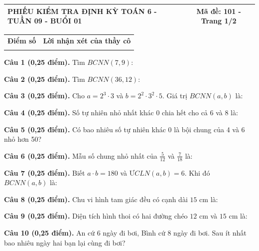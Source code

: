 \documentclass[12pt,a4paper]{article}
\begin{document}
\pagestyle{empty}
\noindent
\begin{tabularx}{\linewidth}{|X|c|}
\hline
\textbf{PHIẾU KIỂM TRA ĐỊNH KỲ TOÁN 6 - TUẦN 09 - BUỔI 01} & \textbf{Mã đề: 101 - Trang 1/2} \\
\hline
\end{tabularx}

\vspace{1.0mm}

\noindent
\begin{tabularx}{\linewidth}{|p{3.2cm}|X|}
\hline
\centering\textbf{Điểm số} & \centering\textbf{Lời nhận xét của thầy cô} \tabularnewline
\rule{0pt}{1.8cm} & \\
\hline
\end{tabularx}

\vspace{1.0mm}

\noindent\textbf{Câu 1 (0,25 điểm).} Tìm $BCNN(7, 9)$: \par\vspace{0.25mm}
\noindent\textbf{Câu 2 (0,25 điểm).} Tìm $BCNN(36, 12)$: \par\vspace{0.25mm}
\noindent\textbf{Câu 3 (0,25 điểm).} Cho $a = 2^3 \cdot 3$ và $b = 2^2 \cdot 3^2 \cdot 5$. Giá trị $BCNN(a, b)$ là: \par\vspace{0.25mm}
\noindent\textbf{Câu 4 (0,25 điểm).} Số tự nhiên nhỏ nhất khác 0 chia hết cho cả 6 và 8 là: \par\vspace{0.25mm}
\noindent\textbf{Câu 5 (0,25 điểm).} Có bao nhiêu số tự nhiên khác 0 là bội chung của 4 và 6 nhỏ hơn 50? \par\vspace{0.25mm}
\noindent\textbf{Câu 6 (0,25 điểm).} Mẫu số chung nhỏ nhất của $\frac{5}{12}$ và $\frac{7}{18}$ là: \par\vspace{0.25mm}
\noindent\textbf{Câu 7 (0,25 điểm).} Biết $a \cdot b = 180$ và $ƯCLN(a, b) = 6$. Khi đó $BCNN(a, b)$ là: \par\vspace{0.25mm}
\noindent\textbf{Câu 8 (0,25 điểm).} Chu vi hình tam giác đều có cạnh dài $15\text{ cm}$ là: \par\vspace{0.25mm}
\noindent\textbf{Câu 9 (0,25 điểm).} Diện tích hình thoi có hai đường chéo $12\text{ cm}$ và $15\text{ cm}$ là: \par\vspace{0.25mm}
\noindent\textbf{Câu 10 (0,25 điểm).} An cứ 6 ngày đi bơi, Bình cứ 8 ngày đi bơi. Sau ít nhất bao nhiêu ngày hai bạn lại cùng đi bơi? \par\vspace{0.25mm}
\end{document}
